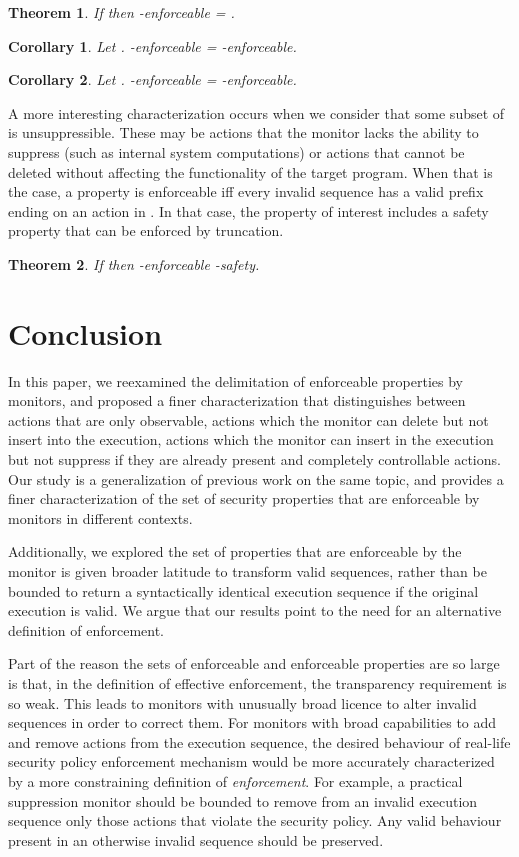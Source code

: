 \documentclass[12pt]{article}
\newtheorem{thm}{Theorem}
\newtheorem{cor}{Corollary}
\begin{document}
\begin{thm}\label{thm:total}
If  then -enforceable = .
\end{thm}


\begin{cor}
Let  . -enforceable = -enforceable.
\end{cor}

\begin{cor}
Let  . -enforceable =
-en\-for\-ceable.
\end{cor}

A more interesting characterization occurs when we consider that some subset of  is unsuppressible. These may be actions that the monitor lacks the ability to suppress (such as internal system computations) or actions that cannot be deleted without affecting the functionality of the target program. When that is the case, a property is enforceable iff every invalid sequence has a valid prefix ending on an action in .  In that case, the property of interest includes a safety property that can be enforced by truncation.
\begin{thm}
If  then -enforceable -safety.
\end{thm}



\section{Conclusion}\label{sec:conclusion}

In this paper, we reexamined the delimitation of enforceable properties by monitors, and proposed a finer characterization that distinguishes between actions that are only observable, actions which the monitor can delete but not insert into the execution, actions which the monitor can insert in the execution but not suppress if they are already present and completely controllable actions. Our study is a generalization of previous work on the same topic, and provides a finer characterization of the set of security properties that are enforceable by monitors in different contexts.

Additionally, we explored the set of properties that are enforceable by the monitor is given broader latitude to transform valid sequences, rather than be bounded to return a syntactically identical execution sequence  if the original execution is valid. We argue that our results point to the need for an alternative definition of enforcement.

Part of the reason the sets of enforceable and enforceable properties are so large is that, in the definition of effective enforcement, the transparency requirement is so weak. This leads to monitors with unusually broad licence to alter invalid sequences in order to correct them.  For monitors with broad capabilities to add and remove actions from the execution sequence, the desired behaviour of real-life security policy enforcement mechanism would be more accurately characterized by a more constraining definition of \textit{enforcement}.  For example, a practical suppression monitor should be bounded to remove from an invalid execution sequence only those actions that violate the security policy. Any valid behaviour present in an otherwise invalid sequence should be preserved.
\end{document}
